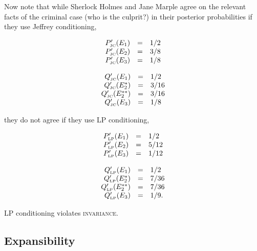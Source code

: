 \documentclass[smallextended]{svjour3}       %
\begin{document}
Now note that while Sherlock Holmes and Jane Marple agree on the
relevant facts of the criminal case (who is the culprit?) in their
posterior probabilities if they use Jeffrey conditioning,

\begin{equation}
  \label{eq:sherlockposteriorjc}
  \begin{array}{rcl}
  P'_{\mbox{\tiny JC}}(E_{1})&=&1/2\\
  P'_{\mbox{\tiny JC}}(E_{2})&=&3/8\\
  P'_{\mbox{\tiny JC}}(E_{3})&=&1/8
\end{array}
\end{equation}

\begin{equation}
  \label{eq:marpleposteriorjc}
  \begin{array}{rcl}
  Q'_{\mbox{\tiny JC}}(E_{1})&=&1/2\\
  Q'_{\mbox{\tiny JC}}(E_{2}^{*})&=&3/16\\
  Q'_{\mbox{\tiny JC}}(E_{2}^{**})&=&3/16\\
  Q'_{\mbox{\tiny JC}}(E_{3})&=&1/8
\end{array}
\end{equation}

they do not agree if they use LP conditioning,

\begin{equation}
  \label{eq:sherlockposteriorlp}
  \begin{array}{rcl}
  P'_{\mbox{\tiny LP}}(E_{1})&=&1/2\\
  P'_{\mbox{\tiny LP}}(E_{2})&=&5/12\\
  P'_{\mbox{\tiny LP}}(E_{3})&=&1/12
\end{array}
\end{equation}

\begin{equation}
  \label{eq:marpleposteriorlp}
  \begin{array}{rcl}
  Q'_{\mbox{\tiny LP}}(E_{1})&=&1/2\\
  Q'_{\mbox{\tiny LP}}(E_{2}^{*})&=&7/36\\
  Q'_{\mbox{\tiny LP}}(E_{2}^{**})&=&7/36\\
  Q'_{\mbox{\tiny LP}}(E_{3})&=&1/9.
\end{array}
\end{equation}

LP conditioning violates \textsc{invariance}.

\subsection{Expansibility}
\label{Expansibility}
\end{document}
